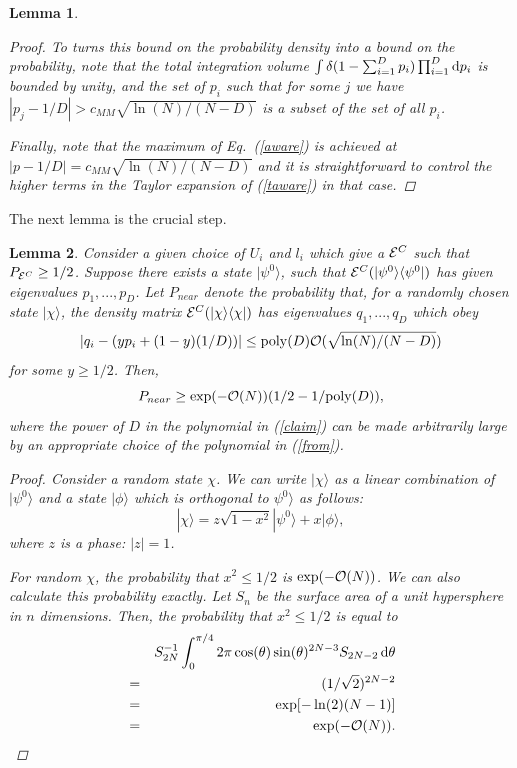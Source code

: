\documentclass[aps,prl,amsmath,amssymb,amsfonts,superscriptaddress,floatfix]{revtex4}
\newtheorem{lemma}{Lemma}
\newcommand{\cmm}{c_{MM}}
\newcommand{\conc}{{\cal E}^C}
\newcommand{\pN}{P_{near}}
\newcommand{\be}{\begin{equation}}
\newcommand{\ee}{\end{equation}}
\begin{document}
\begin{lemma}
\begin{proof}
To turns this bound on the probability density into a bound on the
probability, note that
the total integration volume $\int \delta(1-\sum_{i=1}^D p_i)
\prod_{i=1}^D {\rm d}p_i$ is bounded by unity, and the set of
$p_i$ such that for some $j$ we have $|p_j-1/D|>\cmm \sqrt{\ln(N)/(N-D)}$ is a subset
of the set of all $p_i$.

Finally, note that the maximum of Eq.~(\ref{aware}) is achieved
at $|p-1/D|=\cmm \sqrt{\ln(N)/(N-D)}$ and it is straightforward to control the higher terms in the
Taylor expansion of (\ref{taware}) in that case.
\end{proof}
\end{lemma}





The next lemma is the crucial step.
\begin{lemma}
\label{cstep}
Consider a given choice of $U_i$ and $l_i$ which give
a $\conc$ such that $P_{\conc}\geq 1/2$.  
Suppose there exists a state
$|\psi^0\rangle$, such that $\conc(|\psi^0\rangle\langle\psi^0|)$ has
given eigenvalues $p_1,...,p_D$.  Let $\pN$ denote
the probability that, for a randomly
chosen state $|\chi\rangle$, the density matrix $\conc(|\chi\rangle\langle\chi|)$ has
eigenvalues $q_1,...,q_D$ which obey
\be
\label{from}
|q_i-(y p_i+(1-y)(1/D))|\leq 
{\rm poly}(D)
{\cal O}(\sqrt{\ln(N)/(N-D)})
\ee
for some $y\geq 1/2$.
Then,
\be
\label{claim}
\pN \geq \exp(-{\cal O}(N)) (1/2-1/{\rm poly}(D)),
\ee
where the power of $D$ in the polynomial in (\ref{claim}) can be made arbitrarily large by
an appropriate choice of the polynomial in (\ref{from}).
\begin{proof}
Consider a random state $\chi$.
We can write $|\chi\rangle$ as a linear combination
of $|\psi^0\rangle$ and a state $|\phi\rangle$ which is
orthogonal to $\psi^0\rangle$ as follows:
\be
\label{below}
|\chi\rangle=z \sqrt{1-x^2}|\psi^0\rangle+x|\phi\rangle,
\ee
where $z$ is a phase: $|z|=1$.

For random $\chi$, the probability that $x^2\leq 1/2$ is
$\exp(-{\cal O}(N))$.  We can also calculate this
probability exactly.  Let
$S_n$ be the surface area of a unit hypersphere in $n$ dimensions.
Then, the probability that $x^2\leq 1/2$ is equal to
\begin{eqnarray}
\label{below2}
&&S_{2N}^{-1} \int_0^{\pi/4} 
2\pi \cos(\theta) \sin(\theta)^{2N-3} S_{2N-2} \,
{\rm d\theta} 
\\ \nonumber
&=& 
(1/\sqrt{2})^{2N-2}
\\ \nonumber
&=&\exp[-\ln(2) (N-1)]
\\ \nonumber
&=& \exp(-{\cal O}(N)).
\end{eqnarray}


\end{proof}
\end{lemma}
\end{document}
